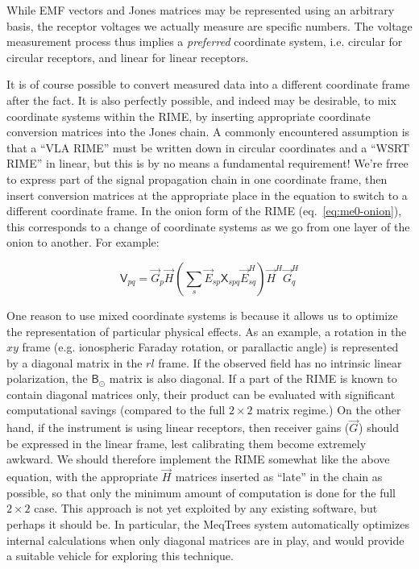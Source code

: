 \documentclass[]{aa}
\newcommand{\herm}{H}
\newcommand{\jones}[2]{\vec {#1}_{#2}}
\newcommand{\jonesT}[2]{\vec {#1}^{\herm}_{#2}}
\newcommand{\coh}[2]{\mathsf{{#1}}_{{#2}}}
\begin{document}
While EMF vectors and Jones matrices may be represented using an arbitrary basis, the receptor voltages we actually measure are specific numbers. The voltage measurement process thus implies a {\em preferred} coordinate system, i.e. circular for circular receptors, and linear for linear receptors. 

It is of course possible to convert measured data into a different coordinate frame after the fact. It is also perfectly possible, and indeed may be desirable, to mix coordinate systems within the RIME, by inserting appropriate coordinate conversion matrices into the Jones chain. A commonly encountered assumption is that a ``VLA RIME'' must be written down in circular coordinates and a ``WSRT RIME'' in linear, but this is by no means a fundamental requirement! We're frree to express part of the signal propagation chain in one coordinate frame, then insert conversion matrices at the appropriate place in the equation to switch to a different coordinate frame. In the onion form of the RIME (eq.~\ref{eq:me0-onion}), this corresponds to a change of coordinate systems as we go from one layer of the onion to another. For example:

\[
\coh{V}{pq} = \jones{G}{p} \jones{H}{} \left ( \sum_{s} \jones{E}{sp} \coh{X}{spq} 
\jonesT{E}{sq} \right ) \jonesT{H}{} \jonesT{G}{q}
\] 

One reason to use mixed coordinate systems is because it allows us to optimize the representation of particular physical effects. As an example, a rotation in the $xy$ frame (e.g. ionospheric Faraday rotation, or parallactic angle) is represented by a diagonal matrix in the $rl$ frame. If the observed field has no intrinsic linear polarization, the $\coh{B}{\odot}$ matrix is also diagonal. If a part of the RIME is known to contain diagonal matrices only, their product can be evaluated with significant computational savings (compared to the full $2\times2$ matrix regime.) On the other hand, if the instrument is using linear receptors, then receiver gains ($\jones{G}{}$) should be expressed in the linear frame, lest calibrating them become extremely awkward. We should therefore implement the RIME somewhat like the above equation, with the appropriate $\jones{H}{}$ matrices inserted as ``late'' in the chain as possible, so that only the minimum amount of computation is done for the full $2\times2$ case. This approach is not yet exploited by any existing software, but perhaps it should be. In particular, the MeqTrees system \citep{meqtrees} automatically optimizes internal calculations when only diagonal matrices are in play, and would provide a suitable vehicle for exploring this technique.
\end{document}
